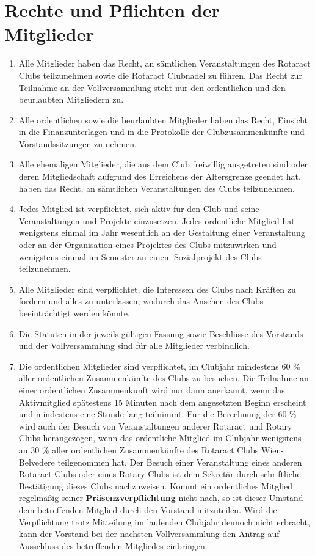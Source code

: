 \documentclass{article}
\begin{document}
\section{Rechte und Pflichten der Mitglieder}
\begin{enumerate}
    \item Alle Mitglieder haben das Recht, an sämtlichen Veranstaltungen des Rotaract Clubs teilzunehmen sowie die Rotaract Clubnadel zu führen. Das Recht zur Teilnahme an der Vollversammlung steht nur den ordentlichen und den beurlaubten Mitgliedern zu.
    \item Alle ordentlichen sowie die beurlaubten Mitglieder haben das Recht, Einsicht in die Finanzunterlagen und in die Protokolle der Clubzusammenkünfte und Vorstandssitzungen zu nehmen.
    \item Alle ehemaligen Mitglieder, die aus dem Club freiwillig ausgetreten sind oder deren Mitgliedschaft aufgrund des Erreichens der Altersgrenze geendet hat, haben das Recht, an sämtlichen Veranstaltungen des Clubs teilzunehmen.
    \item Jedes Mitglied ist verpflichtet, sich aktiv für den Club und seine Veranstaltungen und Projekte einzusetzen. Jedes ordentliche Mitglied hat wenigstens einmal im Jahr wesentlich an der Gestaltung einer Veranstaltung oder an der Organisation eines Projektes des Clubs mitzuwirken und wenigstens einmal im Semester an einem Sozialprojekt des Clubs teilzunehmen.
    \item Alle Mitglieder sind verpflichtet, die Interessen des Clubs nach Kräften zu fördern und alles zu unterlassen, wodurch das Ansehen des Clubs beeinträchtigt werden könnte.
    \item Die Statuten in der jeweils gültigen Fassung sowie Beschlüsse des Vorstands und der Vollversammlung sind für alle Mitglieder verbindlich.
    \item Die ordentlichen Mitglieder sind verpflichtet, im Clubjahr mindestens 60 \% aller ordentlichen Zusammenkünfte des Clubs zu besuchen. Die Teilnahme an einer ordentlichen Zusammenkunft wird nur dann anerkannt, wenn das Aktivmitglied spätestens 15 Minuten nach dem angesetzten Beginn erscheint und mindestens eine Stunde lang teilnimmt. Für die Berechnung der 60 \% wird auch der Besuch von Veranstaltungen anderer Rotaract und Rotary Clubs herangezogen, wenn das ordentliche Mitglied im Clubjahr wenigstens an 30 \% aller ordentlichen Zusammenkünfte des Rotaract Clubs Wien-Belvedere teilgenommen hat. Der Besuch einer Veranstaltung eines anderen Rotaract Clubs oder eines Rotary Clubs ist dem Sekretär durch schriftliche Bestätigung dieses Clubs nachzuweisen. Kommt ein ordentliches Mitglied regelmäßig seiner \textbf{Präsenzverpflichtung} nicht nach, so ist dieser Umstand dem betreffenden Mitglied durch den Vorstand mitzuteilen. Wird die Verpflichtung trotz Mitteilung im laufenden Clubjahr dennoch nicht erbracht, kann der Vorstand bei der nächsten Vollversammlung den Antrag auf Ausschluss des betreffenden Mitgliedes einbringen.

\end{enumerate}
\end{document}
